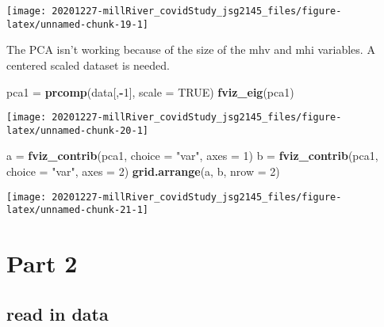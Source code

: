 \documentclass[
]{article}
\newenvironment{Shaded}{\begin{snugshade}}{\end{snugshade}}
\newcommand{\DataTypeTok}[1]{\textcolor[rgb]{0.13,0.29,0.53}{#1}}
\newcommand{\DecValTok}[1]{\textcolor[rgb]{0.00,0.00,0.81}{#1}}
\newcommand{\KeywordTok}[1]{\textcolor[rgb]{0.13,0.29,0.53}{\textbf{#1}}}
\newcommand{\NormalTok}[1]{#1}
\newcommand{\OperatorTok}[1]{\textcolor[rgb]{0.81,0.36,0.00}{\textbf{#1}}}
\newcommand{\OtherTok}[1]{\textcolor[rgb]{0.56,0.35,0.01}{#1}}
\newcommand{\StringTok}[1]{\textcolor[rgb]{0.31,0.60,0.02}{#1}}
\begin{document}
\texttt{[image: 20201227-millRiver\_covidStudy\_jsg2145\_files/figure-latex/unnamed-chunk-19-1]}

The PCA isn't working because of the size of the mhv and mhi variables.
A centered scaled dataset is needed.

\begin{Shaded}
\begin{Highlighting}[]
\NormalTok{pca1 =}\StringTok{ }\KeywordTok{prcomp}\NormalTok{(data[,}\OperatorTok{-}\DecValTok{1}\NormalTok{], }\DataTypeTok{scale =} \OtherTok{TRUE}\NormalTok{)}
\KeywordTok{fviz_eig}\NormalTok{(pca1)}
\end{Highlighting}
\end{Shaded}

\texttt{[image: 20201227-millRiver\_covidStudy\_jsg2145\_files/figure-latex/unnamed-chunk-20-1]}

\begin{Shaded}
\begin{Highlighting}[]
\NormalTok{a =}\StringTok{ }\KeywordTok{fviz_contrib}\NormalTok{(pca1, }\DataTypeTok{choice =} \StringTok{"var"}\NormalTok{, }\DataTypeTok{axes =} \DecValTok{1}\NormalTok{) }
\NormalTok{b =}\StringTok{ }\KeywordTok{fviz_contrib}\NormalTok{(pca1, }\DataTypeTok{choice =} \StringTok{"var"}\NormalTok{, }\DataTypeTok{axes =} \DecValTok{2}\NormalTok{) }
\KeywordTok{grid.arrange}\NormalTok{(a, b, }\DataTypeTok{nrow =} \DecValTok{2}\NormalTok{)}
\end{Highlighting}
\end{Shaded}

\texttt{[image: 20201227-millRiver\_covidStudy\_jsg2145\_files/figure-latex/unnamed-chunk-21-1]}

\hypertarget{part-2}{%
\section{Part 2}\label{part-2}}

\hypertarget{read-in-data-1}{%
\subsection{read in data}\label{read-in-data-1}}

\begin{Shaded}
\end{Shaded}
\end{document}
